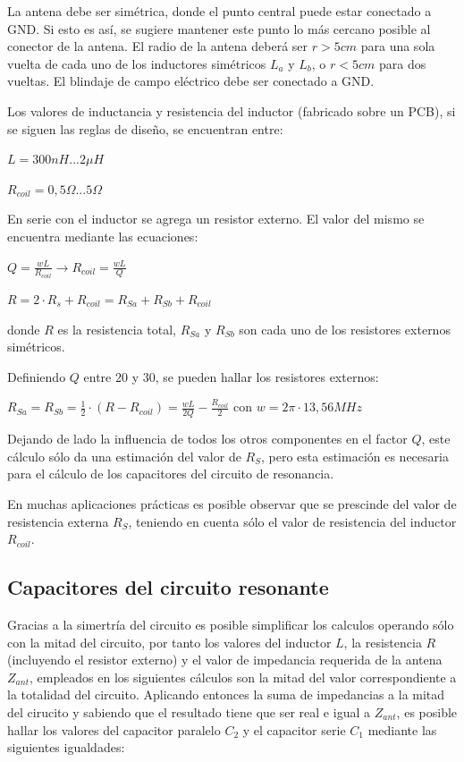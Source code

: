 
La antena debe ser simétrica, donde el punto central puede estar conectado a GND. Si esto es así, se sugiere mantener este punto lo más cercano posible al conector de la antena.
El radio de la antena deberá ser $r > 5cm$ para una sola vuelta de cada uno de los inductores simétricos $L_{a}$ y $L_{b}$, o $r < 5cm$ para dos vueltas.
El blindaje de campo eléctrico debe ser conectado a GND.

Los valores de inductancia y resistencia del inductor (fabricado sobre un PCB), si se siguen las reglas de diseño, se encuentran entre: 

$ L = 300nH {...} 2\mu H $

$ R_{coil} =0,5\Omega {...} 5\Omega $


\bigskip
\begin{itshape}
\end{itshape}


En serie con el inductor se agrega un resistor externo. El valor del mismo se encuentra mediante las ecuaciones:

\centerline{$ Q = \frac{w L}{R_{coil}} \rightarrow R_{coil} = \frac{w L}{Q}$}

\centerline{$ R = 2 \cdot R_{s} + R_{coil} = R_{Sa} + R_{Sb} + R_{coil} $}

donde $R$ es la resistencia total, $R_{Sa}$ y $R_{Sb}$ son cada uno de los resistores externos simétricos.

Definiendo $Q$ entre 20 y 30, se pueden hallar los resistores externos:

$R_{Sa} = R_{Sb} = \frac{1}{2} \cdot (R - R_{coil}) = \frac{wL}{2Q} - \frac{R_{coil}}{2}$ con $w = 2 \pi \cdot 13,56 MHz$


Dejando de lado la influencia de todos los otros componentes en el factor $Q$, este cálculo sólo da una estimación del valor de $R_{S}$, pero esta estimación es necesaria para el cálculo de los capacitores del circuito de resonancia. 

\bigskip
\bigskip
	En muchas aplicaciones prácticas es posible observar que se prescinde del valor de 	resistencia externa $R_{S}$, teniendo en cuenta sólo el valor de resistencia del inductor $R_{coil}$.	

\subsection{Capacitores del circuito resonante}\label{capresonan}
Gracias a la simertría del circuito es posible simplificar los calculos operando sólo con la mitad del circuito, por tanto los valores del inductor $L$, la resistencia $R$ (incluyendo el resistor externo) y el valor de impedancia requerida de la antena $Z_{ant}$, empleados en los siguientes cálculos son la mitad del valor correspondiente a la totalidad del circuito. 
Aplicando entonces la suma de impedancias a la mitad del cirucito y sabiendo que el resultado tiene que ser real e igual a $Z_{ant}$, es posible hallar los valores del capacitor paralelo $C_{2}$ y el capacitor serie $C_{1}$ mediante las siguientes igualdades:


